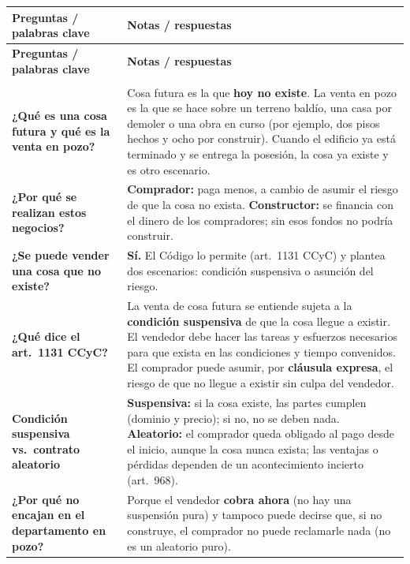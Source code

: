 \documentclass[12pt,oneside]{book}
\begin{document}
{\small
\begin{longtable}{>{\RaggedRight\arraybackslash}p{4.2cm} >{\RaggedRight\arraybackslash}p{10.3cm}}
\toprule
\textbf{Preguntas / palabras clave} & \textbf{Notas / respuestas} \\
\midrule
\endfirsthead
\toprule
\textbf{Preguntas / palabras clave} & \textbf{Notas / respuestas} \\
\midrule
\endhead
\midrule
\multicolumn{2}{r}{\textit{continúa en la página siguiente}} \\
\endfoot
\endlastfoot

\textbf{¿Qué es una cosa futura y qué es la venta en pozo?} &
Cosa futura es la que \textbf{hoy no existe}. La venta en pozo es la que se hace sobre un terreno baldío, una casa por demoler o una obra en curso (por ejemplo, dos pisos hechos y ocho por construir). Cuando el edificio ya está terminado y se entrega la posesión, la cosa ya existe y es otro escenario. \\
\addlinespace
\cmidrule{1-2}
\textbf{¿Por qué se realizan estos negocios?} &
\textbf{Comprador:} paga menos, a cambio de asumir el riesgo de que la cosa no exista. \textbf{Constructor:} se financia con el dinero de los compradores; sin esos fondos no podría construir. \\
\addlinespace
\cmidrule{1-2}
\textbf{¿Se puede vender una cosa que no existe?} &
\textbf{Sí.} El Código lo permite (art.~1131 CCyC) y plantea dos escenarios: condición suspensiva o asunción del riesgo. \\
\addlinespace
\cmidrule{1-2}
\textbf{¿Qué dice el art.~1131 CCyC?} &
La venta de cosa futura se entiende sujeta a la \textbf{condición suspensiva} de que la cosa llegue a existir. El vendedor debe hacer las tareas y esfuerzos necesarios para que exista en las condiciones y tiempo convenidos. El comprador puede asumir, por \textbf{cláusula expresa}, el riesgo de que no llegue a existir sin culpa del vendedor. \\
\addlinespace
\cmidrule{1-2}
\textbf{Condición suspensiva vs.\ contrato aleatorio} &
\textbf{Suspensiva:} si la cosa existe, las partes cumplen (dominio y precio); si no, no se deben nada. \textbf{Aleatorio:} el comprador queda obligado al pago desde el inicio, aunque la cosa nunca exista; las ventajas o pérdidas dependen de un acontecimiento incierto (art.~968). \\
\addlinespace
\cmidrule{1-2}
\textbf{¿Por qué no encajan en el departamento en pozo?} &
Porque el vendedor \textbf{cobra ahora} (no hay una suspensión pura) y tampoco puede decirse que, si no construye, el comprador no puede reclamarle nada (no es un aleatorio puro). \\

\end{longtable}}
\end{document}

